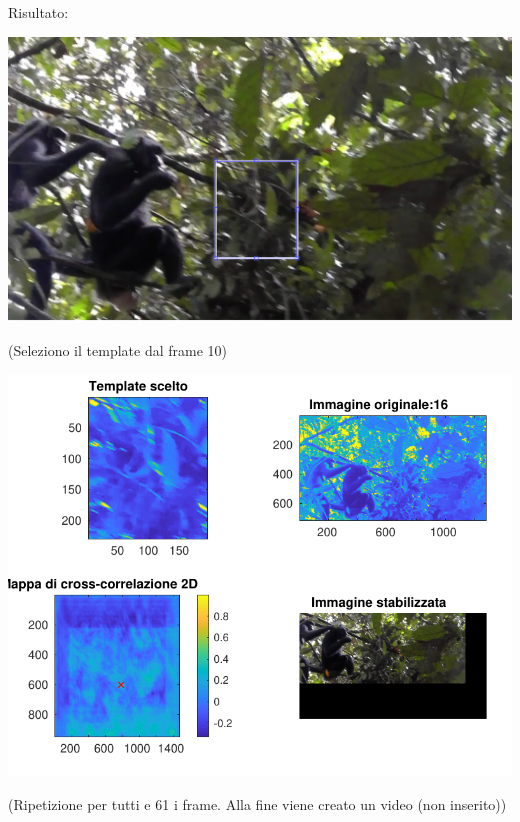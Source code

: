 \documentclass[a4paper, 10pt]{report}
\begin{document}
\noindent Risultato:
\begin{center}
\includegraphics[scale=0.5]{base.pdf}

(Seleziono il template dal frame 10)

\includegraphics[scale=0.8]{2.pdf}

(Ripetizione per tutti e 61 i frame. Alla fine viene creato un video (non inserito))
\end{center}
\end{document}
